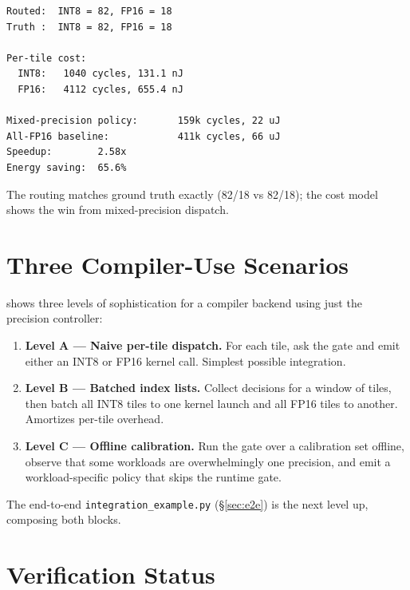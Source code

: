 \documentclass[11pt]{article}
\begin{document}
\begin{lstlisting}[basicstyle=\ttfamily\small]
Routed:  INT8 = 82, FP16 = 18
Truth :  INT8 = 82, FP16 = 18

Per-tile cost:
  INT8:   1040 cycles, 131.1 nJ
  FP16:   4112 cycles, 655.4 nJ

Mixed-precision policy:       159k cycles, 22 uJ
All-FP16 baseline:            411k cycles, 66 uJ
Speedup:        2.58x
Energy saving:  65.6%
\end{lstlisting}

The routing matches ground truth exactly (82/18 vs 82/18); the cost
model shows the win from mixed-precision dispatch.

\section{Three Compiler-Use Scenarios}
\label{sec:scenarios}

 shows three levels
of sophistication for a compiler backend using just the precision
controller:

\begin{enumerate}
\item \textbf{Level A --- Naive per-tile dispatch.} For each tile, ask
      the gate and emit either an INT8 or FP16 kernel call. Simplest
      possible integration.
\item \textbf{Level B --- Batched index lists.} Collect decisions for
      a window of tiles, then batch all INT8 tiles to one kernel
      launch and all FP16 tiles to another. Amortizes per-tile
      overhead.
\item \textbf{Level C --- Offline calibration.} Run the gate over a
      calibration set offline, observe that some workloads are
      overwhelmingly one precision, and emit a workload-specific
      policy that skips the runtime gate.
\end{enumerate}

The end-to-end \texttt{integration\_example.py} (\S\ref{sec:e2e}) is
the next level up, composing both blocks.

\section{Verification Status}
\label{sec:verif}
\end{document}
